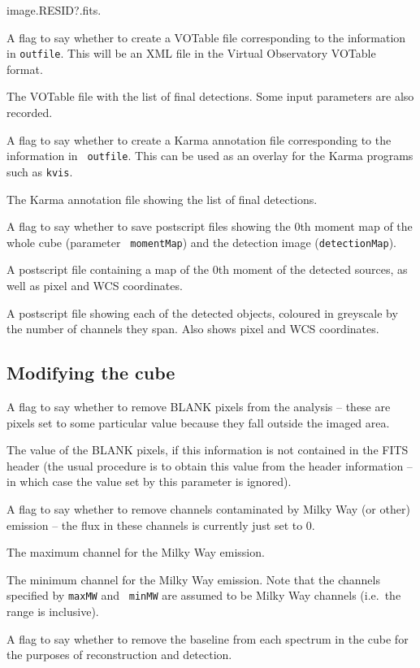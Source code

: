 \documentclass[12pt,a4paper]{article}
\newcommand{\ie}{i.e.\ }
\newcommand{\entrylabel}[1]{\mbox{\textsf{\bf{#1:}}}\hfil}
\newenvironment{entry}
        {\begin{list}{}%
                {\renewcommand{\makelabel}{\entrylabel}%
                        \setlength{\labelwidth}{30mm}%
                        \setlength{\labelsep}{5pt}%
                        \setlength{\itemsep}{2pt}%
                        \setlength{\parsep}{2pt}%
                        \setlength{\leftmargin}{35mm}%
                }%
        }%
{\end{list}}
\begin{document}
\begin{entry}
{  image.RESID?.fits}.
\item[flagVOT {\tt [false]}] A flag to say whether to create a VOTable
  file corresponding to the information in {\tt outfile}. This will be
  an XML file in the Virtual Observatory VOTable format.
\item[votFile {\tt [./duchamp-Results.xml]}] The VOTable file with the
  list of final detections. Some input parameters are also recorded.
\item[flagKarma {\tt [false]}] A flag to say whether to create a Karma
  annotation file corresponding to the information in {\tt
  outfile}. This can be used as an overlay for the Karma programs such
  as {\tt kvis}.
\item[karmaFile {\tt [./duchamp-Results.ann]}] The Karma annotation
  file showing the list of final detections. 
\item[flagMaps {\tt [true]}] A flag to say whether to save postscript
  files showing the 0th moment map of the whole cube (parameter {\tt
  momentMap}) and the detection image ({\tt detectionMap}).
\item[momentMap {\tt [./latest-moment-map.ps]}] A postscript file
  containing a map of the 0th moment of the detected sources, as well
  as pixel and WCS coordinates.
\item[detectionMap {\tt [./latest-detection-map.ps]}] A postscript
  file showing each of the detected objects, coloured in greyscale by
  the number of channels they span. Also shows pixel and WCS
  coordinates.
\end{entry}

\subsection*{Modifying the cube}
\begin{entry}
\item[flagBlankPix {\tt [true]}] A flag to say whether to remove BLANK
  pixels from the analysis -- these are pixels set to some particular
  value because they fall outside the imaged area.
\item[blankPixValue {\tt [-8.00061]}] The value of the BLANK pixels,
  if this information is not contained in the FITS header (the usual
  procedure is to obtain this value from the header information -- in
  which case the value set by this parameter is ignored).
\item[flagMW {\tt [true]}] A flag to say whether to remove channels
  contaminated by Milky Way (or other) emission -- the flux in these
  channels is currently just set to 0.
\item[maxMW {\tt [112]}] The maximum channel for the Milky Way
  emission.
\item[minMW {\tt [75]}] The minimum channel for the Milky Way
  emission. Note that the channels specified by {\tt maxMW} and {\tt
  minMW} are assumed to be Milky Way channels (\ie the range is
  inclusive).
\item[flagBaseline {\tt [false]}] A flag to say whether to remove the
  baseline from each spectrum in the cube for the purposes of
  reconstruction and detection.
\end{entry}
\end{document}
